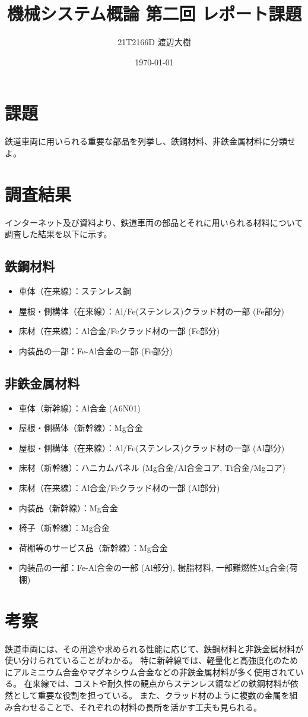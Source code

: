 \documentclass[a4paper,11pt,dvipdfmx]{jsarticle}
\begin{document}

\title{機械システム概論 第二回 レポート課題}
\author{21T2166D 渡辺大樹}
\date{\today}
\maketitle

\section*{課題}
鉄道車両に用いられる重要な部品を列挙し、鉄鋼材料、非鉄金属材料に分類せよ。

\section*{調査結果}
インターネット及び資料より、鉄道車両の部品とそれに用いられる材料について調査した結果を以下に示す。

\subsection*{鉄鋼材料}
\begin{itemize}
    \item 車体（在来線）：ステンレス鋼
    \item 屋根・側構体（在来線）：Al/Fe(ステンレス)クラッド材の一部 (Fe部分)
    \item 床材（在来線）：Al合金/Feクラッド材の一部 (Fe部分)
    \item 内装品の一部：Fe-Al合金の一部 (Fe部分)
\end{itemize}

\subsection*{非鉄金属材料}
\begin{itemize}
    \item 車体（新幹線）：Al合金 (A6N01)
    \item 屋根・側構体（新幹線）：Mg合金
    \item 屋根・側構体（在来線）：Al/Fe(ステンレス)クラッド材の一部 (Al部分)
    \item 床材（新幹線）：ハニカムパネル (Mg合金/Al合金コア, Ti合金/Mgコア)
    \item 床材（在来線）：Al合金/Feクラッド材の一部 (Al部分)
    \item 内装品（新幹線）：Mg合金
    \item 椅子（新幹線）：Mg合金
    \item 荷棚等のサービス品（新幹線）：Mg合金
    \item 内装品の一部：Fe-Al合金の一部 (Al部分), 樹脂材料, 一部難燃性Mg合金(荷棚)
\end{itemize}

\section*{考察}
鉄道車両には、その用途や求められる性能に応じて、鉄鋼材料と非鉄金属材料が使い分けられていることがわかる。
特に新幹線では、軽量化と高強度化のためにアルミニウム合金やマグネシウム合金などの非鉄金属材料が多く使用されている。
在来線では、コストや耐久性の観点からステンレス鋼などの鉄鋼材料が依然として重要な役割を担っている。
また、クラッド材のように複数の金属を組み合わせることで、それぞれの材料の長所を活かす工夫も見られる。
\end{document}
